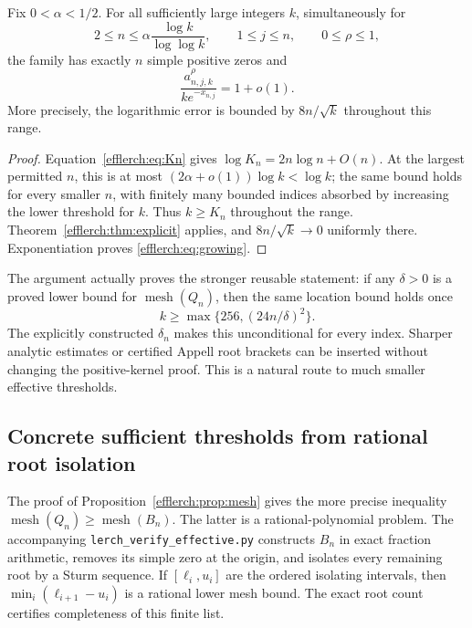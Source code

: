 \begin{corollary}
\label{efflerch:cor:growing}
Fix $0<\alpha<1/2$.  For all sufficiently large integers $k$,
simultaneously for
\[
 2\leq n\leq\alpha\frac{\log k}{\log\log k},\qquad
 1\leq j\leq n,\qquad 0\leq\rho\leq1,
\]
the family has exactly $n$ simple positive zeros and
\begin{equation}\label{efflerch:eq:growing}
 \frac{a_{n,j,k}^\rho}{k e^{-x_{n,j}}}=1+o(1).
\end{equation}
More precisely, the logarithmic error is bounded by $8n/\sqrt{k}$
throughout this range.
\end{corollary}
\begin{proof}
Equation~\eqref{efflerch:eq:Kn} gives
$\log K_n=2n\log n+O(n)$.  At the largest permitted $n$, this is
at most $(2\alpha+o(1))\log k<\log k$; the same bound holds for
every smaller $n$, with finitely many bounded indices absorbed by
increasing the lower threshold for $k$.  Thus $k\geq K_n$ throughout
the range.  Theorem~\ref{efflerch:thm:explicit} applies, and
$8n/\sqrt{k}\to0$ uniformly there.  Exponentiation proves
\eqref{efflerch:eq:growing}.
\end{proof}

\begin{remark}
The argument actually proves the stronger reusable statement: if any
$\delta>0$ is a proved lower bound for $\operatorname{mesh}(Q_n)$, then
the same location bound holds once
\[
 k\geq\max\{256,(24n/\delta)^2\}.
\]
The explicitly constructed $\delta_n$ makes this unconditional for every
index.  Sharper analytic estimates or certified Appell root brackets can
be inserted without changing the positive-kernel proof.  This is a
natural route to much smaller effective thresholds.
\end{remark}

\subsection{Concrete sufficient thresholds from rational root isolation}

The proof of Proposition~\ref{efflerch:prop:mesh} gives the more precise
inequality $\operatorname{mesh}(Q_n)\geq\operatorname{mesh}(B_n)$.
The latter is a rational-polynomial problem.  The accompanying
\texttt{lerch\_verify\_effective.py} constructs $B_n$ in exact fraction
arithmetic, removes its simple zero at the origin, and isolates every
remaining root by a Sturm sequence.  If $[\ell_i,u_i]$ are the ordered
isolating intervals, then
$\min_i(\ell_{i+1}-u_i)$ is a rational lower mesh bound.
The exact root count certifies completeness of this finite list.

